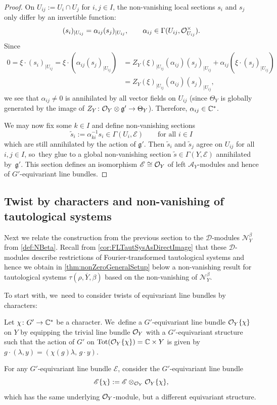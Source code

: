 \documentclass[11pt]{article}
\newcommand{\cA}{\mathscr{A}}
\newcommand{\frg}{\mathfrak{g}}
\DeclareMathOperator{\Tot}{Tot}
\newcommand\restr[2]{{#1_{| {#2}}}}
\newcommand\restrK[2]{{(#1)_{| {#2}}}}
\begin{document}
\begin{proof}
On $U_{ij} := U_i \cap U_j$ for $i,j \in I$, the non-vanishing local sections $s_i$ and $s_j$ only differ by an invertible function:
\[
\restrK{s_i}{U_{ij}} = \alpha_{ij} \restrK{s_j}{U_{ij}}, \qquad \alpha_{ij} \in \Gamma(U_{ij},\O_{U_{ij}}^\times).
\]
Since
\begin{align*}
0 = \xi \cdot \restrK{s_i}{U_{ij}} = \xi \cdot (\alpha_{ij} \restrK{s_j}{U_{ij}}) &= \restr{Z_Y(\xi)}{U_{ij}}(\alpha_{ij}) \restrK{s_j}{U_{ij}} + \alpha_{ij} (\xi \cdot \restrK{s_j}{U_{ij}}) \\
&= \restr{Z_Y(\xi)}{U_{ij}}(\alpha_{ij}) \restrK{s_j}{U_{ij}},
\end{align*}
we see that $\alpha_{ij} \neq 0$ is annihilated by all vector fields on $U_{ij}$ (since $\Theta_Y$ is globally generated by the image of $Z_Y \colon \O_Y \otimes \frg' \to \Theta_Y$). Therefore, $\alpha_{ij} \in {\mathbb C}^*$.

We may now fix some $k \in I$ and define non-vanishing sections
\[
\tilde s_i := \alpha_{ki}^{-1} s_i \in \Gamma(U_i,\mathscr{E}) \qquad \text{for all } i \in I
\]
which are still annihilated by the action of $\frg'$.
Then $\tilde s_i$ and $\tilde s_j$ agree on $U_{ij}$ for all $i,j \in I$, so~they glue to a global non-vanishing section $\tilde s \in \Gamma(Y,\mathscr{E})$ annihilated by~$\frg'$. This section defines an isomorphism $\mathscr{E} \cong \mathcal{O}_Y$ of left $\cA_Y$\nobreakdash-mod\-ules and hence of $G'$\nobreakdash-equi\-variant line bundles.
\end{proof}

\subsection{Twist by characters and non-vanishing of tautological systems} \label{sec:Twists}

Next we relate the construction from the previous section to the $\mathscr D$\nobreakdash-mod\-ules $\mathscr N_Y^\beta$ from \cref{def:NBeta}. Recall from \cref{cor:FLTautSysAsDirectImage} that these $\mathscr D$\nobreakdash-mod\-ules describe restrictions of Fourier-transformed tautological systems and hence we obtain in \cref{thm:nonZeroGeneralSetup} below a non-vanishing result for tautological systems $\tau(\rho, \overline Y, \beta)$ based on the non-vanishing of $\mathscr N_Y^\beta$.

To start with, we~need to consider twists of equivariant line bundles by characters:

\begin{dfn}\label{def:EquLineChar}
Let $\chi \colon G' \to {\mathbb C}^*$ be a character. We~define a $G'$-equivariant line bundle $\mathcal{O}_Y\{\chi\}$ on $Y$ by equipping the trivial line bundle $\mathcal{O}_Y$ with a $G'$-equivariant structure such that the action of $G'$ on $\Tot(\O_Y\{\chi\}) = \C \times Y$ is given by $g \cdot (\lambda,y) = (\chi(g)\lambda, \, g \cdot y)$.

For any $G'$-equivariant line bundle $\mathscr{E}$, consider the $G'$-equivariant line bundle
\[
\mathscr{E}\{\chi\} := \mathscr{E} \otimes_{\mathcal{O}_Y} \mathcal{O}_Y\{\chi\},
\]
which has the same underlying $\mathcal{O}_Y$\nobreakdash-mod\-ule, but a different equivariant structure.
\end{dfn}
\end{document}
